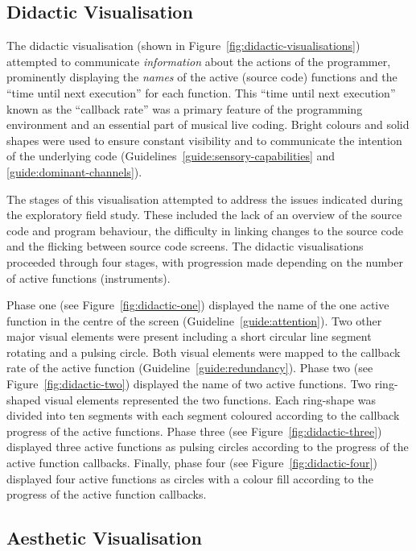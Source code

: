 \subsection{Didactic Visualisation}
\label{sec:didactic-visualisation}



The didactic visualisation (shown in Figure~\ref{fig:didactic-visualisations}) attempted to communicate \emph{information} about the actions of the programmer, prominently displaying the \emph{names} of the active (source code) functions and the ``time until next execution'' for each function. This ``time until next execution'' known as the ``callback rate'' was a primary feature of the programming environment and an essential part of musical live coding. Bright colours and solid shapes were used to ensure constant visibility and to communicate the intention of the underlying code (Guidelines~\ref{guide:sensory-capabilities} and \ref{guide:dominant-channels}). 

The stages of this visualisation attempted to address the issues indicated during the exploratory field study. These included the lack of an overview of the source code and program behaviour, the difficulty in linking changes to the source code and the flicking between source code screens. The didactic visualisations proceeded through four stages, with progression made depending on the number of active functions (instruments).

Phase one (see Figure~\ref{fig:didactic-one}) displayed the name of the one active function in the centre of the screen (Guideline~\ref{guide:attention}). Two other major visual elements were present including a short circular line segment rotating and a pulsing circle. Both visual elements were mapped to the callback rate of the active function (Guideline~\ref{guide:redundancy}). Phase two (see Figure~\ref{fig:didactic-two}) displayed the name of two active functions. Two ring-shaped visual elements represented the two functions. Each ring-shape was divided into ten segments with each segment coloured according to the callback progress of the active functions. Phase three (see Figure~\ref{fig:didactic-three}) displayed three active functions as pulsing circles according to the progress of the active function callbacks. Finally, phase four (see Figure~\ref{fig:didactic-four}) displayed four active functions as circles with a colour fill according to the progress of the active function callbacks.

\subsection{Aesthetic Visualisation}
\label{sec:aesthetic-visualisation}

